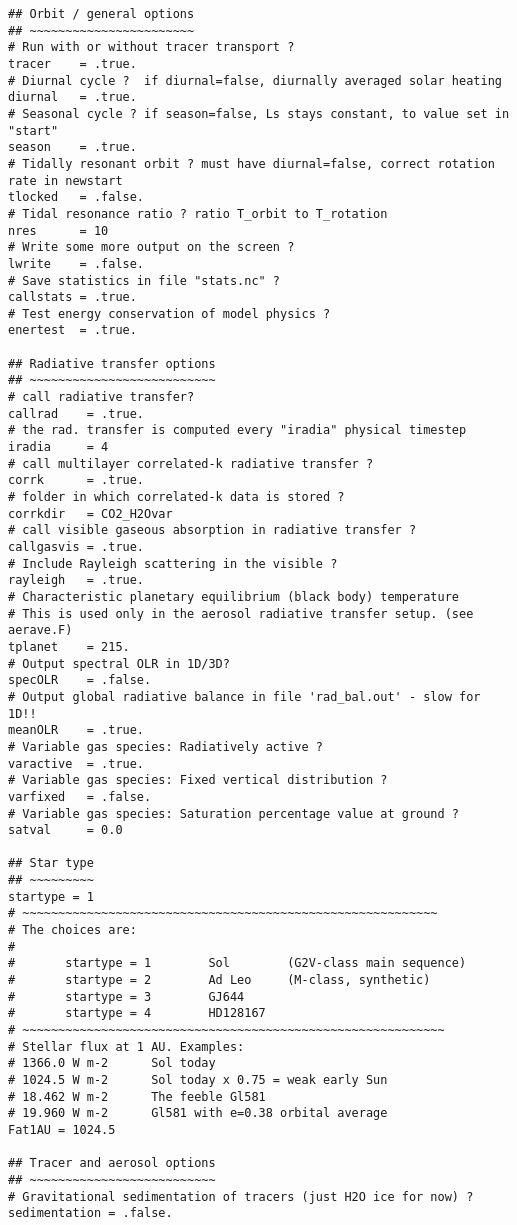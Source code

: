 {\footnotesize
\begin{verbatim}
## Orbit / general options
## ~~~~~~~~~~~~~~~~~~~~~~~
# Run with or without tracer transport ?
tracer    = .true.
# Diurnal cycle ?  if diurnal=false, diurnally averaged solar heating
diurnal   = .true.
# Seasonal cycle ? if season=false, Ls stays constant, to value set in "start"
season    = .true.
# Tidally resonant orbit ? must have diurnal=false, correct rotation rate in newstart
tlocked   = .false.
# Tidal resonance ratio ? ratio T_orbit to T_rotation
nres      = 10
# Write some more output on the screen ?
lwrite    = .false.
# Save statistics in file "stats.nc" ?
callstats = .true.
# Test energy conservation of model physics ?
enertest  = .true.

## Radiative transfer options
## ~~~~~~~~~~~~~~~~~~~~~~~~~~
# call radiative transfer?
callrad    = .true.
# the rad. transfer is computed every "iradia" physical timestep
iradia     = 4
# call multilayer correlated-k radiative transfer ?
corrk      = .true.
# folder in which correlated-k data is stored ?
corrkdir   = CO2_H2Ovar
# call visible gaseous absorption in radiative transfer ?
callgasvis = .true.
# Include Rayleigh scattering in the visible ?
rayleigh   = .true.
# Characteristic planetary equilibrium (black body) temperature
# This is used only in the aerosol radiative transfer setup. (see aerave.F)
tplanet    = 215.
# Output spectral OLR in 1D/3D?
specOLR    = .false.
# Output global radiative balance in file 'rad_bal.out' - slow for 1D!!
meanOLR    = .true.
# Variable gas species: Radiatively active ?
varactive  = .true.
# Variable gas species: Fixed vertical distribution ?
varfixed   = .false.
# Variable gas species: Saturation percentage value at ground ?
satval     = 0.0

## Star type
## ~~~~~~~~~
startype = 1
# ~~~~~~~~~~~~~~~~~~~~~~~~~~~~~~~~~~~~~~~~~~~~~~~~~~~~~~~~~~
# The choices are:
#
#	    startype = 1		Sol        (G2V-class main sequence)
#    	startype = 2		Ad Leo     (M-class, synthetic)
#       startype = 3        GJ644
#       startype = 4        HD128167
# ~~~~~~~~~~~~~~~~~~~~~~~~~~~~~~~~~~~~~~~~~~~~~~~~~~~~~~~~~~~
# Stellar flux at 1 AU. Examples:
# 1366.0 W m-2		Sol today
# 1024.5 W m-2		Sol today x 0.75 = weak early Sun
# 18.462 W m-2		The feeble Gl581
# 19.960 W m-2		Gl581 with e=0.38 orbital average
Fat1AU = 1024.5

## Tracer and aerosol options
## ~~~~~~~~~~~~~~~~~~~~~~~~~~
# Gravitational sedimentation of tracers (just H2O ice for now) ?
sedimentation = .false.


\end{verbatim}}
